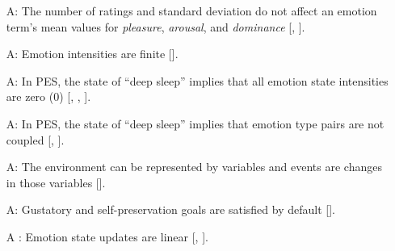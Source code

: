\begin{itemize}
    \item[A\refstepcounter{assumpnum}\theassumpnum \label{A_PADStats}:] The 
    number of ratings and standard deviation do not affect an emotion term's 
    mean values for \textit{pleasure}, \textit{arousal}, and \textit{dominance}
    [, ].

    \item[A\refstepcounter{assumpnum}\theassumpnum \label{A_LimitIntensity}:]
    Emotion intensities are finite [].

    \item[A\refstepcounter{assumpnum}\theassumpnum \label{A_PositiveIntensity}:]
    In PES, the state of ``deep sleep'' implies that all emotion state
    intensities are zero (0) [, 
    , ].

    \item[A\refstepcounter{assumpnum}\theassumpnum \label{A_EmotionPairs}:] In 
    PES, the state of ``deep sleep'' implies that emotion type pairs are not 
    coupled [, ].

    \item[A\refstepcounter{assumpnum}\theassumpnum \label{A_Events}:]
    The environment can be represented by variables and events are changes in
    those variables  [].

    \item[A\refstepcounter{assumpnum}\theassumpnum \label{A_GustatoryGoal}:]
    Gustatory and self-preservation goals are satisfied by default 
    [].

    \item[A\refstepcounter{assumpnum}\theassumpnum 
    \label{A_UpdateEmotionState}:] Emotion state updates are linear 
    [, ].

\end{itemize}